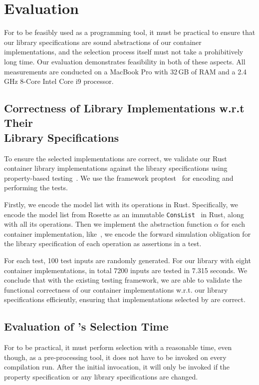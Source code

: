 \section{Evaluation}
\label{chap2:evaluation}

For \Primrose{} to be feasibly used as a programming tool, it must be practical to ensure that our library specifications are sound abstractions of our container implementations, and the selection process itself must not take a prohibitively long time.
Our evaluation demonstrates feasibility in both of these aspects. All measurements are conducted on a MacBook Pro with 32\,GB of RAM and a 2.4\,GHz 8-Core Intel Core i9 processor.

\subsection{Correctness of Library Implementations w.r.t Their\\Library Specifications}
\label{chap2:evaluation:testing}
To ensure the selected implementations are correct, we validate our Rust container library implementations against the library specifications using property-based testing~\citep{quickcheck}. 
We use the framework proptest~\citep{proptest}
for encoding and performing the tests.

Firstly, we encode the model list with its operations in Rust. Specifically, we encode the model list from Rosette as an immutable \lstinline|ConsList|~\citep{conslist}
in Rust, along with all its operations. Then we implement the abstraction function $\alpha$ for each container implementation, like~\cite{cogentcase,sle}, we encode the forward simulation obligation for the library specification of each operation as assertions in a test.

For each test, 100 test inputs are randomly generated. For our library with eight container implementations, in total 7200 inputs are tested in 7.315 seconds. We conclude that with the existing testing framework, we are able to validate the functional correctness of our container implementations w.r.t. our library specifications efficiently, ensuring that implementations selected by \Primrose{} are correct.

\subsection{Evaluation of \Primrose{}'s Selection Time}
\label{chap2:evaluation:efficiency}
For \Primrose{} to be practical, it must perform selection with a reasonable time, even though, as a pre-processing tool, it does not have to be invoked on every compilation run. After the initial invocation, it will only be invoked if the property specification or any library specifications are changed.

